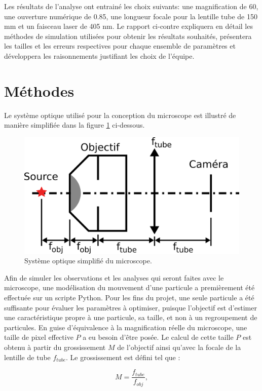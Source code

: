 \documentclass[conference]{IEEEtran}
\begin{document}
Les résultats de l'analyse ont entrainé les choix suivants: une magnification de 60, une ouverture numérique de 0.85, une longueur focale pour la lentille tube
de 150 mm et un faisceau laser de 405 nm. Le rapport ci-contre expliquera en détail les méthodes de simulation utilisées pour obtenir 
les résultats souhaités, présentera les tailles et les erreurs respectives pour chaque ensemble de paramètres et développera les raisonnements
justifiant les choix de l'équipe.


\section{Méthodes \label{methodes}}
Le système optique utilisé pour la conception du microscope est illustré de manière simplifiée
dans la figure \ref{sys} ci-dessous.
\begin{figure}[H]
  \centering
  \includegraphics[scale=2.3]{systeme.png}
  \caption{Système optique simplifié du microscope.}
  \label{sys}
\end{figure}
Afin de simuler les observations et les analyses qui seront faites avec le microscope,
une modélisation du mouvement d'une particule a premièrement été effectuée sur un scripte Python.
Pour les fins du projet, une seule particule a été suffisante pour
évaluer les paramètres à optimiser, puisque l'objectif est d'estimer une caractéristique propre 
à une particule, sa taille, et non à un regroupement de particules. En guise d'équivalence à la magnification réelle du microscope, 
une taille de pixel effective $P$ a eu besoin d'être posée. Le calcul de cette taille $P$ est obtenu à partir du grossissement $M$ de l'objectif ainsi qu'avec la
focale de la lentille de tube $f_{tube}$. Le grossissement est défini tel que :

\begin{equation}\label{m_1}
  M = \frac{f_{tube}}{f_{obj}},
\end{equation}
\end{document}
